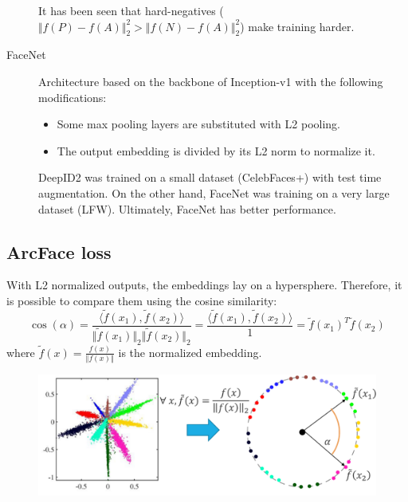 \begin{description}
        \begin{remark}
            It has been seen that hard-negatives ($\Vert f(P) - f(A) \Vert_2^2 > \Vert f(N) - f(A) \Vert_2^2$) make training harder.
        \end{remark}

    \item[FaceNet] 
        Architecture based on the backbone of Inception-v1 with the following modifications:
        \begin{itemize}
            \item Some max pooling layers are substituted with L2 pooling.
            \item The output embedding is divided by its L2 norm to normalize it.
        \end{itemize}

        \begin{remark}
            DeepID2 was trained on a small dataset (CelebFaces+) with test time augmentation. On the other hand, FaceNet was training on a very large dataset (LFW). Ultimately, FaceNet has better performance.
        \end{remark}
\end{description}


\subsection{ArcFace loss}

\begin{remark}
    With L2 normalized outputs, the embeddings lay on a hypersphere. Therefore, it is possible to compare them using the cosine similarity:
    \[ 
        \cos(\alpha) 
            = \frac{\langle \tilde{f}(x_1), \tilde{f}(x_2) \rangle}{\Vert \tilde{f}(x_1) \Vert_2 \Vert \tilde{f}(x_2) \Vert_2} 
            = \frac{\langle \tilde{f}(x_1), \tilde{f}(x_2) \rangle}{1} 
            = \tilde{f}(x_1)^T \tilde{f}(x_2)
    \]
    where $\tilde{f}(x) = \frac{f(x)}{\Vert f(x) \Vert}$ is the normalized embedding.

    \begin{figure}[H]
        \centering
        \includegraphics[width=0.6\linewidth]{./img/_embedding_l2_norm_effect.pdf}
    \end{figure}
\end{remark}

